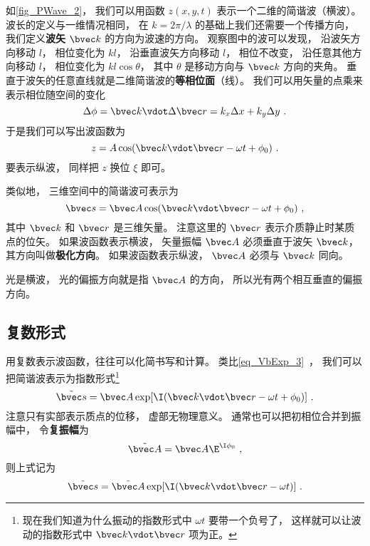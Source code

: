 如\autoref{fig_PWave_2}， 我们可以用函数 $z(x,y,t)$ 表示一个二维的简谐波（横波）。 波长的定义与一维情况相同， 在 $k = 2\pi/\lambda$ 的基础上我们还需要一个传播方向， 我们定义\textbf{波矢} $\bvec k$ 的方向为波速的方向。
观察图中的波可以发现， 沿波矢方向移动 $l$， 相位变化为 $kl$， 沿垂直波矢方向移动 $l$， 相位不改变， 沿任意其他方向移动 $l$， 相位变化为 $kl\cos\theta$， 其中 $\theta$ 是移动方向与 $\bvec k$ 方向的夹角。 垂直于波矢的任意直线就是二维简谐波的\textbf{等相位面}（线）。 我们可以用矢量的点乘来表示相位随空间的变化
\begin{equation}
\Delta\phi = \bvec k \vdot \Delta\bvec r = k_x \Delta x + k_y \Delta y~.
\end{equation}
于是我们可以写出波函数为
\begin{equation}\label{eq_PWave_8}
z = A \cos(\bvec k \vdot \bvec r - \omega t + \phi_0)~.
\end{equation}
要表示纵波， 同样把 $z$ 换位 $\xi$ 即可。

类似地， 三维空间中的简谐波可表示为
\begin{equation}
\bvec s = \bvec A \cos(\bvec k \vdot \bvec r - \omega t + \phi_0)~,
\end{equation}
其中 $\bvec k$ 和 $\bvec r$ 是三维矢量。 注意这里的 $\bvec r$ 表示介质静止时某质点的位矢。 如果波函数表示横波， 矢量振幅 $\bvec A$ 必须垂直于波矢 $\bvec k$， 其方向叫做\textbf{极化方向}。 如果波函数表示纵波， $\bvec A$ 必须与 $\bvec k$ 同向。

光是横波， 光的偏振方向就是指 $\bvec A$ 的方向， 所以光有两个相互垂直的偏振方向。

\subsection{复数形式}

用复数表示波函数，往往可以化简书写和计算。 类比\autoref{eq_VbExp_3}~， 我们可以把简谐波表示为指数形式\footnote{现在我们知道为什么振动的指数形式中 $\omega t$ 要带一个负号了， 这样就可以让波动的指数形式中 $\bvec k\vdot \bvec r$ 项为正。}
\begin{equation}
\tilde {\bvec s} = \bvec A \exp[\I( \bvec k \vdot \bvec r - \omega t + \phi_0)]~.
\end{equation}
注意只有实部表示质点的位移， 虚部无物理意义。 通常也可以把初相位合并到振幅中， 令\textbf{复振幅}为
\begin{equation}
\tilde {\bvec A} = \bvec A \E^{\I \phi_0}~,
\end{equation}
则上式记为
\begin{equation}
\tilde {\bvec s} = \tilde {\bvec A} \exp[\I( \bvec k \vdot \bvec r - \omega t)]~.
\end{equation}
